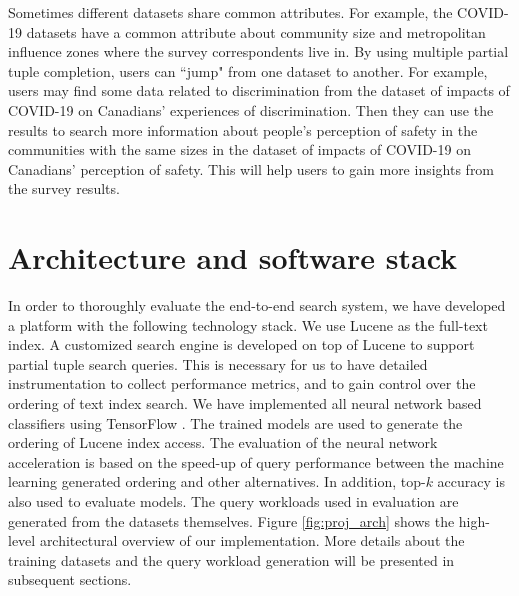 \documentclass[conference]{IEEEtran}
\begin{document}
Sometimes different datasets share common attributes. For example, the COVID-19 datasets have a common attribute about community size and metropolitan influence zones where the survey correspondents live in. By using multiple partial tuple completion, users can ``jump" from one dataset to another. For example, users may find some data related to discrimination from the dataset of impacts of COVID-19 on Canadians’ experiences of discrimination. Then they can use the results to search more information about people's perception of safety in the communities with the same sizes in the dataset of impacts of COVID-19 on Canadians’ perception of safety. This will help users to gain more insights from the survey results.

\section{Architecture and software stack}
In order to thoroughly evaluate the end-to-end search system, we have developed a platform with the following technology stack.  We use Lucene \cite{lucene} as the full-text index.  A customized search engine is developed on top of Lucene to support partial tuple search queries.  This is necessary for us to have detailed instrumentation to collect performance metrics, and to gain control over the ordering of text index search.  We have implemented all neural network based classifiers using TensorFlow \cite{tensorflow}. The trained models are used to generate the ordering of Lucene index access. 
The evaluation of the neural network acceleration is based on the speed-up of query performance between the machine learning generated ordering and other alternatives.
In addition, top-$k$ accuracy is also used to evaluate models.
The query workloads used in evaluation are generated from the datasets themselves. Figure \ref{fig:proj_arch} shows the high-level architectural overview of our implementation. More details about the training datasets and the query workload generation will be presented in subsequent sections.
\end{document}
